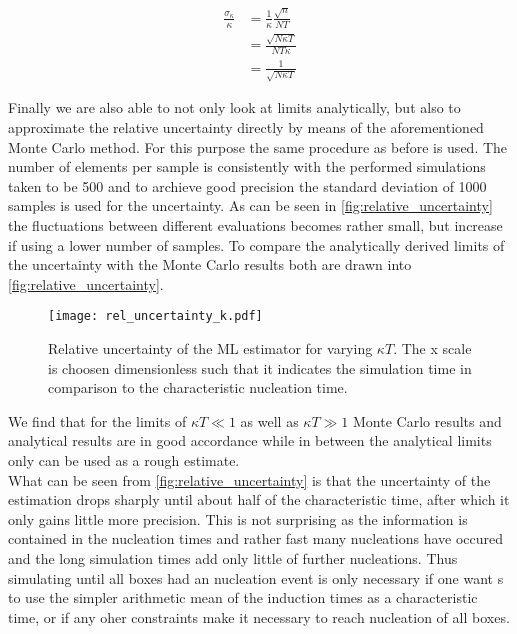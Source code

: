 \begin{align}
\label{eqn:uncertainty_k_ll}
\frac{\sigma_{\kappa}}{\kappa} &= \frac{1}{\kappa} \frac{\sqrt{n}}{NT}\\
&=\frac{\sqrt{N \kappa T}}{N T \kappa}\\
&=\frac{1}{\sqrt{N \kappa T}}
\end{align}

Finally we are also able to not only look at limits analytically, but also to approximate the relative uncertainty directly by means of the aforementioned Monte Carlo method. For this purpose the same procedure as before is used. The number of elements per sample is consistently with the performed simulations taken to be 500 and to archieve good precision the standard deviation of 1000 samples is used for the uncertainty. As can be seen in \autoref{fig:relative_uncertainty} the fluctuations between different evaluations becomes rather small, but increase if using a lower number of samples. To compare the analytically derived limits of the uncertainty with the Monte Carlo results both are drawn into \autoref{fig:relative_uncertainty}.

\begin{figure}[h]
\begin{center}
\texttt{[image: rel\_uncertainty\_k.pdf]}
\caption{Relative uncertainty of the ML estimator for varying $\kappa T$. The x scale is choosen dimensionless such that it indicates the simulation time in comparison to the characteristic nucleation time.}
\label{fig:relative_uncertainty}
\end{center}
\end{figure}

We find that for the limits of $\kappa T \ll 1$ as well as $\kappa T \gg 1$ Monte Carlo results and analytical results are in good accordance while in between the analytical limits only can be used as a rough estimate.\\

What can be seen from \autoref{fig:relative_uncertainty} is that the uncertainty of the estimation drops sharply until about half of the characteristic time, after which it only gains little more precision. This is not surprising as the information is contained in the nucleation times and rather fast many nucleations have occured and the long simulation times add only little of further nucleations. Thus simulating until all boxes had an nucleation event is only necessary if one want s to use the simpler arithmetic mean of the induction times as a characteristic time, or if any oher constraints make it necessary to reach nucleation of all boxes.

